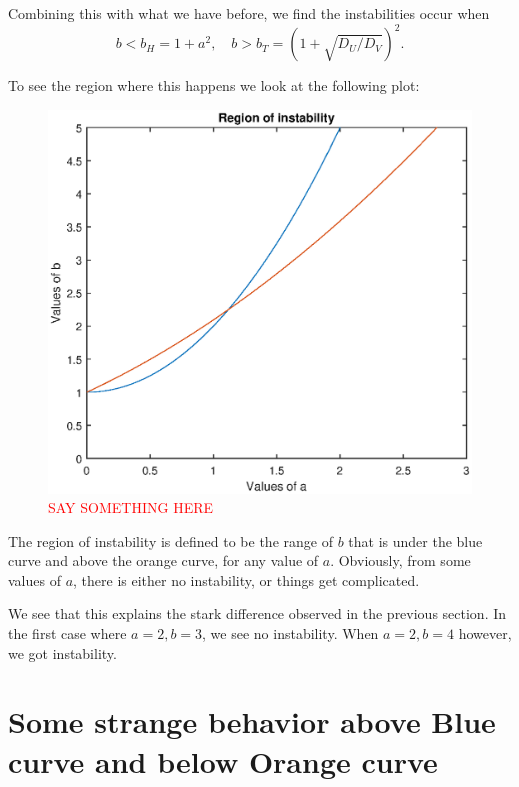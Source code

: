 \documentclass{book}
\theoremstyle{definition}
\begin{document}
Combining this with what we have before, we find the instabilities occur when 
\begin{equation*}
b < b_H  = 1+a^2, \quad b > b_T = (1 + \sqrt{D_U / D_V})^2.
\end{equation*}

To see the region where this happens we look at the following plot:
\begin{figure}[!htb]
	\centering
	\includegraphics[scale=0.6]{Turing_patterns/Turing_5.eps}
	\caption{\textcolor{red}{SAY SOMETHING HERE}}
	\label{Fig:21}
\end{figure}

The region of instability is defined to be the range of $b$ that is under the blue curve and above the orange curve, for any value of $a$. Obviously, from some values of $a$, there is either no instability, or things get complicated. 



We see that this explains the stark difference observed in the previous section. In the first case where $a=2,b=3$, we see no instability. When $a=2, b=4$ however, we got instability. 



\section{Some strange behavior above Blue curve and below Orange curve}
\end{document}
